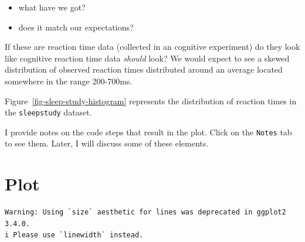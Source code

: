 \documentclass[
  letterpaper,
  DIV=11,
  numbers=noendperiod]{scrreprt}
\newenvironment{Shaded}{\begin{snugshade}}{\end{snugshade}}
\newcommand{\AttributeTok}[1]{\textcolor[rgb]{0.40,0.45,0.13}{#1}}
\newcommand{\DecValTok}[1]{\textcolor[rgb]{0.68,0.00,0.00}{#1}}
\newcommand{\FloatTok}[1]{\textcolor[rgb]{0.68,0.00,0.00}{#1}}
\newcommand{\FunctionTok}[1]{\textcolor[rgb]{0.28,0.35,0.67}{#1}}
\newcommand{\NormalTok}[1]{\textcolor[rgb]{0.00,0.23,0.31}{#1}}
\newcommand{\SpecialCharTok}[1]{\textcolor[rgb]{0.37,0.37,0.37}{#1}}
\newcommand{\StringTok}[1]{\textcolor[rgb]{0.13,0.47,0.30}{#1}}
\providecommand{\tightlist}{%
  \setlength{\itemsep}{0pt}\setlength{\parskip}{0pt}}\usepackage{longtable,booktabs,array}
\begin{document}
\begin{itemize}
\tightlist
\item
  what have we got?
\item
  does it match our expectations?
\end{itemize}

If these are reaction time data (collected in an cognitive experiment)
do they look like cognitive reaction time data \emph{should} look? We
would expect to see a skewed distribution of observed reaction times
distributed around an average located somewhere in the range 200-700ms.

Figure~\ref{fig-sleep-study-histogram} represents the distribution of
reaction times in the \texttt{sleepstudy} dataset.

I provide notes on the code steps that result in the plot. Click on the
\texttt{Notes} tab to see them. Later, I will discuss some of these
elements.

\section{Plot}

\begin{Shaded}
\end{Shaded}

\begin{verbatim}
Warning: Using `size` aesthetic for lines was deprecated in ggplot2 3.4.0.
i Please use `linewidth` instead.
\end{verbatim}
\end{document}
